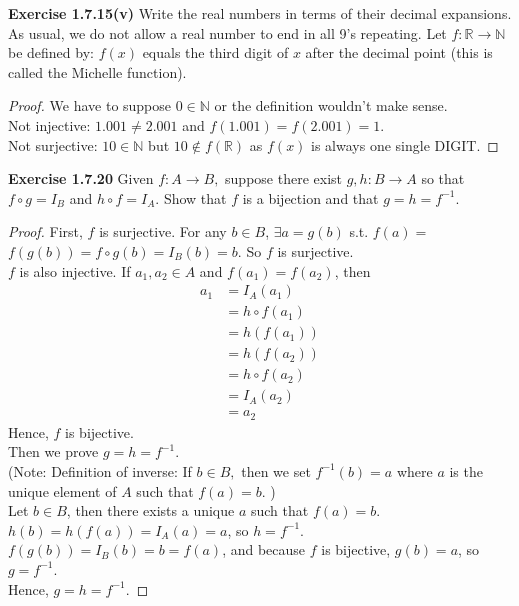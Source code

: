 \documentclass[12pt]{article}
\newcommand{\bbN}{\mathbb{N}}
\newcommand{\bbR}{\mathbb{R}}
\theoremstyle{definition}
\numberwithin{equation}{subsection}
\begin{document}
\textbf{Exercise 1.7.15(v)} Write the real numbers in terms of their decimal expansions. As
usual, we do not allow a real number to end in all 9's repeating.
Let \(f: \mathbb{R} \rightarrow \mathbb{N}\) be defined by: \(f(x)\) equals the third digit of \(x\) after
the decimal point (this is called the Michelle function).
\begin{proof}
We have to suppose $0 \in \bbN$ or the definition wouldn't make sense.\\
Not injective:
$1.001 \neq 2.001$ and $f(1.001)=f(2.001)=1$.\\
Not surjective:
$10 \in \bbN$ but $10 \notin f(\bbR)$ as $f(x)$ is always one single DIGIT.
\end{proof}

\textbf{Exercise 1.7.20} Given \(f: A \rightarrow B,\) suppose there exist \(g, h: B \rightarrow A\)
so that \(f \circ g=I_{B}\) and \(h \circ f=I_{A} .\) Show that \(f\) is a bijection and that
\(g=h=f^{-1} .\)
\begin{proof}
First, \(f\) is surjective. For any \(b \in B\), \(\exists a=g(b) \) s.t. \(f(a)=\)
\(f\left(g(b)\right)=f \circ g(b)=I_{B}(b)=b .\) So \(f\) is surjective.\\
$f$ is also injective. If $a_1, a_2 \in A $ and $f(a_1)=f(a_2)$, then
\begin{align*}
a_{1} &=I_{A}\left(a_{1}\right) \\
&=h \circ f\left(a_{1}\right) \\
&=h\left(f\left(a_{1}\right)\right) \\
&=h\left(f\left(a_{2}\right)\right) \\
&=h \circ f\left(a_{2}\right) \\
&=I_{A}\left(a_{2}\right) \\
&=a_2
\end{align*}
Hence, $f$ is bijective. \\
Then we prove \(g=h=f^{-1} .\)\\
(Note: Definition of inverse: If \(b \in B,\) then we set
\(f^{-1}(b)=a\) where \(a\) is the unique element of \(A\) such that \(f(a)=b\).
)\\
Let $b \in B$, then there exists a unique $a$ such that $f(a)=b$.\\ $h(b)=h(f(a))=I_A(a)=a$, so $h=f^{-1}$.
\\$f(g(b))=I_B(b)=b=f(a)$, and because $f$ is bijective, $g(b)=a$, so $g=f^{-1}$.\\
Hence, $g=h=f^{-1}$.
\end{proof}
\end{document}

